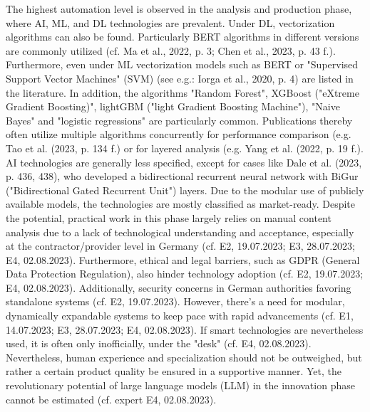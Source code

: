 \documentclass[10pt]{article}
\begin{document}
The highest automation level is observed in the analysis and production phase, where AI, ML, and DL technologies are prevalent.
Under DL, vectorization algorithms can also be found. Particularly BERT algorithms in different versions are commonly utilized
(cf. Ma et al., 2022, p. 3; Chen et al., 2023, p. 43 f.). Furthermore, even under ML vectorization models such as BERT or
"Supervised Support Vector Machines" (SVM) (see e.g.: Iorga et al., 2020, p. 4) are listed in the literature.
In addition, the algorithms "Random Forest", XGBoost ("eXtreme Gradient Boosting)",
lightGBM ("light Gradient Boosting Machine"), "Naive Bayes" and "logistic regressions" are particularly common.
Publications thereby often utilize multiple algorithms concurrently for performance comparison (e.g. Tao et al. (2023, p. 134 f.)
or for layered analysis (e.g. Yang et al. (2022, p. 19 f.). AI technologies are generally less specified,
except for cases like Dale et al. (2023, p. 436, 438), who developed a bidirectional recurrent neural network with
BiGur ("Bidirectional Gated Recurrent Unit") layers. Due to the modular use of publicly available models,
the technologies are mostly classified as market-ready. Despite the potential, practical work in this phase
largely relies on manual content analysis due to a lack of technological understanding and acceptance,
especially at the contractor/provider level in Germany (cf. E2, 19.07.2023; E3, 28.07.2023; E4, 02.08.2023). Furthermore,
ethical and legal barriers, such as GDPR (General Data Protection Regulation), also hinder technology adoption
(cf. E2, 19.07.2023; E4, 02.08.2023). Additionally, security concerns in German authorities favoring
standalone systems (cf. E2, 19.07.2023). However, there's a need for modular, dynamically expandable
systems to keep pace with rapid advancements (cf. E1, 14.07.2023; E3, 28.07.2023; E4, 02.08.2023).
If smart technologies are nevertheless used, it is often only inofficially, under the "desk" (cf. E4, 02.08.2023).
Nevertheless, human experience and specialization should not be outweighed, but rather a certain product quality
be ensured in a supportive manner. Yet, the revolutionary potential of large language models (LLM)
in the innovation phase cannot be estimated (cf. expert E4, 02.08.2023).
\end{document}

